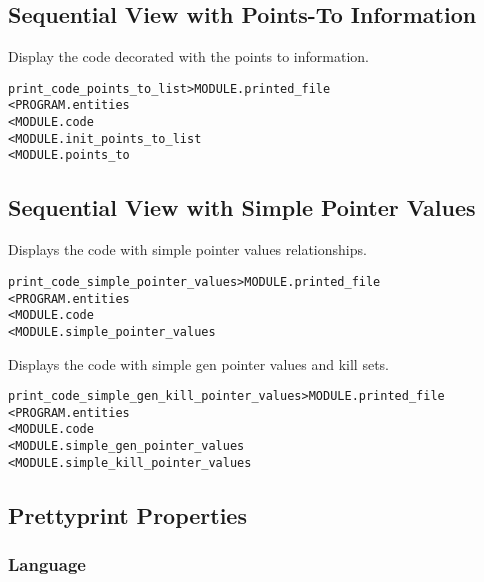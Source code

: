 \documentclass[a4paper]{report}
\newenvironment{PipsMake}{\begin{alltt}}{\end{alltt}}
\newenvironment{PipsPass}[1]{\label{pass:#1}}{}
\begin{document}
\subsection{Sequential View with Points-To  Information}

Display the code decorated with the points to information.

\begin{PipsMake}
print_code_points_to_list      > MODULE.printed_file
        < PROGRAM.entities
        < MODULE.code
        < MODULE.init_points_to_list
        < MODULE.points_to
\end{PipsMake}

\subsection{Sequential View with Simple Pointer Values}

\begin{PipsPass}{print_code_simple_pointer_values}
Displays the code with simple pointer values relationships.
\end{PipsPass}

\begin{PipsMake}
print_code_simple_pointer_values      > MODULE.printed_file
        < PROGRAM.entities
        < MODULE.code
        < MODULE.simple_pointer_values
\end{PipsMake}

\begin{PipsPass}{print_code_genkill_pointer_values}
Displays the code with simple gen pointer values and kill sets.
\end{PipsPass}

\begin{PipsMake}
print_code_simple_gen_kill_pointer_values      > MODULE.printed_file
        < PROGRAM.entities
        < MODULE.code
        < MODULE.simple_gen_pointer_values
        < MODULE.simple_kill_pointer_values

\end{PipsMake}

\subsection{Prettyprint Properties}


\subsubsection{Language}
\end{document}
